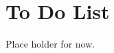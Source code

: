 \documentclass[tom-jenni]{subfile}
\begin{document}
	
	\chapter{To Do List}
	
	Place holder for now.
	
\end{document}
